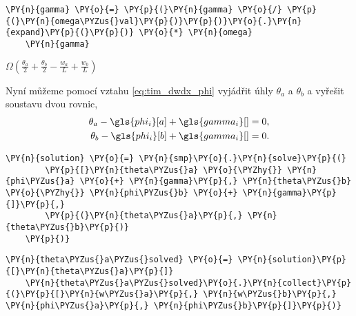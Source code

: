 \begin{tcolorbox}[breakable, size=fbox, boxrule=1pt, pad at break*=1mm,colback=cellbackground, colframe=cellborder]
    \begin{Verbatim}[commandchars=\\\{\}]
    \PY{n}{gamma} \PY{o}{=} \PY{p}{(}\PY{n}{gamma} \PY{o}{/} \PY{p}{(}\PY{n}{omega\PYZus{}val}\PY{p}{)}\PY{p}{)}\PY{o}{.}\PY{n}{expand}\PY{p}{(}\PY{p}{)} \PY{o}{*} \PY{n}{omega}
    \PY{n}{gamma}
    \end{Verbatim}
    \end{tcolorbox}
            
        
    $\displaystyle \Omega \left(\frac{\theta_{a}}{2} + \frac{\theta_{b}}{2} - \frac{w_{a}}{L} + \frac{w_{b}}{L}\right)$

\vspace{0.3cm}
Nyní můžeme pomocí vztahu \ref{eq:tim_dwdx_phi} vyjádřit úhly $\theta_a$ a $\theta_b$ a vyřešit soustavu dvou rovnic,
\begin{align}
    \theta_a - \gls{phi_i}[a] + \gls{gamma_i}[ ] = 0, \\
    \theta_b - \gls{phi_i}[b] + \gls{gamma_i}[ ] = 0.
\end{align}
    
\begin{tcolorbox}[breakable, size=fbox, boxrule=1pt, pad at break*=1mm,colback=cellbackground, colframe=cellborder]
    \begin{Verbatim}[commandchars=\\\{\}]
    \PY{n}{solution} \PY{o}{=} \PY{n}{smp}\PY{o}{.}\PY{n}{solve}\PY{p}{(}
        \PY{p}{[}\PY{n}{theta\PYZus{}a} \PY{o}{\PYZhy{}} \PY{n}{phi\PYZus{}a} \PY{o}{+} \PY{n}{gamma}\PY{p}{,} \PY{n}{theta\PYZus{}b} \PY{o}{\PYZhy{}} \PY{n}{phi\PYZus{}b} \PY{o}{+} \PY{n}{gamma}\PY{p}{]}\PY{p}{,} 
        \PY{p}{(}\PY{n}{theta\PYZus{}a}\PY{p}{,} \PY{n}{theta\PYZus{}b}\PY{p}{)}
    \PY{p}{)}
    \end{Verbatim}
\end{tcolorbox}
    
\begin{tcolorbox}[breakable, size=fbox, boxrule=1pt, pad at break*=1mm,colback=cellbackground, colframe=cellborder]
    \begin{Verbatim}[commandchars=\\\{\}]
    \PY{n}{theta\PYZus{}a\PYZus{}solved} \PY{o}{=} \PY{n}{solution}\PY{p}{[}\PY{n}{theta\PYZus{}a}\PY{p}{]}
    \PY{n}{theta\PYZus{}a\PYZus{}solved}\PY{o}{.}\PY{n}{collect}\PY{p}{(}\PY{p}{[}\PY{n}{w\PYZus{}a}\PY{p}{,} \PY{n}{w\PYZus{}b}\PY{p}{,} \PY{n}{phi\PYZus{}a}\PY{p}{,} \PY{n}{phi\PYZus{}b}\PY{p}{]}\PY{p}{)}
    \end{Verbatim}
\end{tcolorbox}
             
